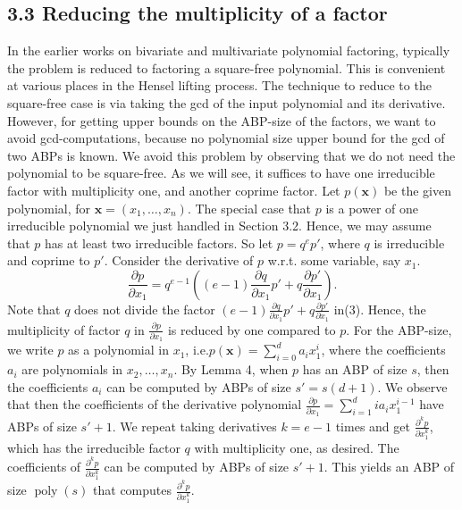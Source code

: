 \documentclass[10pt,a4paper]{article}
\begin{document}
\subsection*{3.3 Reducing the multiplicity of a factor}
In the earlier works on bivariate and multivariate polynomial factoring, typically the problem is reduced to factoring a square-free polynomial. This is convenient at various places in the Hensel lifting process. The technique to reduce to the square-free case is via taking the gcd of the input polynomial and its derivative. However, for getting upper bounds on the ABP-size of the factors, we want to avoid gcd-computations, because no polynomial size upper bound for the gcd of two ABPs is known.
We avoid this problem by observing that we do not need the polynomial to be square-free. As we will see, it suffices to have one irreducible factor with multiplicity one, and another coprime factor.
Let $p(\mathbf x)$ be the given polynomial, for $\mathbf x=(x_1,\ldots,x_n)$. The special case that $p$ is a power of one irreducible polynomial we just handled in Section 3.2. Hence, we may assume that $p$ has at least two irreducible factors. So let $p=q^ep'$, where $q$ is irreducible and coprime to $p'$.
Consider the derivative of $p$ w.r.t. some variable, say $x_1$.
\begin{equation}\frac{\partial p}{\partial x_1}=q^{e-1}\left((e-1)\frac{\partial q}{\partial x_1}p'+q\frac{\partial p'}{\partial x_1}\right).\tag{3}\end{equation}
Note that $q$ does not divide the factor $(e-1)\frac{\partial q}{\partial x_1}p'+q\frac{\partial p'}{\partial x_1}$ in(3). Hence, the multiplicity of factor $q$ in $\frac{\partial p}{\partial x_1}$ is reduced by one compared to $p$.
For the ABP-size, we write $p$ as a polynomial in $x_1$, i.e.$p(\mathbf x)=\sum_{i=0}^da_ix_1^i$, where the coefficients $a_i$ are polynomials in $x_2,\ldots,x_n$. By Lemma 4, when $p$ has an ABP of size $s$, then the coefficients $a_i$ can be computed by ABPs of size $s'=s(d+1)$. We observe that then the coefficients of the derivative polynomial $\frac{\partial p}{\partial x_1}=\sum_{i=1}^d ia_ix_1^{i-1}$ have ABPs of size $s'+1$.
We repeat taking derivatives $k=e-1$ times and get $\frac{\partial^kp}{\partial x_1^k}$, which has the irreducible factor $q$ with multiplicity one, as desired.
The coefficients of $\frac{\partial^kp}{\partial x_1^k}$ can be computed by ABPs of size $s'+1$. This yields an ABP of size $\operatorname{poly}(s)$ that computes $\frac{\partial^kp}{\partial x_1^k}$.
\end{document}
